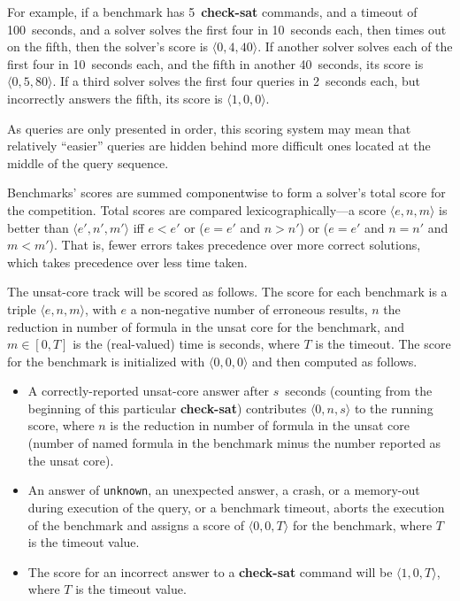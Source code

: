 \documentclass[12pt]{article}
\newcommand{\akey}[1]{\textbf{#1}}
\begin{document}
For example, if a benchmark has 5~\akey{check-sat} commands, and a
timeout of 100~seconds, and a solver solves the first four in
10~seconds each, then times out on the fifth, then the solver's score
is $\langle0,4,40\rangle$.  If another solver solves each of the first
four in 10~seconds each, and the fifth in another 40~seconds, its
score is $\langle0,5,80\rangle$.  If a third solver solves the first
four queries in 2~seconds each, but incorrectly answers the fifth, its
score is $\langle1,0,0\rangle$.

As queries are only presented in order, this scoring system may mean
that relatively ``easier'' queries are hidden behind more difficult
ones located at the middle of the query sequence.

Benchmarks' scores are summed componentwise to form a solver's total
score for the competition.
Total scores are compared lexicographically---a score $\langle e,n,m\rangle$ is better than 
$\langle e',n',m'\rangle$ iff $e < e'$ or ($e = e'$ and $n > n'$) or ($e = e'$ and $n = n'$ and $m < m'$).
That is, fewer errors takes precedence over more correct solutions, which takes precedence over less time taken.


The unsat-core track will be scored as follows. The score for each benchmark is a triple $\langle e,n,m\rangle$, with
$e$ a non-negative number of erroneous results,
$n$ the reduction in number of formula in the unsat core for the benchmark,
and $m\in[0,T]$ is the (real-valued) time is seconds, where $T$ is
the timeout. 
The score for the benchmark is initialized with
$\langle0,0,0\rangle$ and then computed as follows.
\begin{itemize}
\item A correctly-reported unsat-core answer after
  $s$~seconds (counting from the beginning of this particular
  \akey{check-sat}) contributes $\langle0,n,s\rangle$ to the running
  score, where $n$ is the reduction in number of formula in the unsat core (number of named formula in the benchmark minus
  the number reported as the unsat core).
\item An answer of \texttt{unknown}, an unexpected answer, a crash, or a memory-out during
  execution of the query, or a benchmark timeout, aborts the execution
  of the benchmark and assigns a score of $\langle0,0,T\rangle$ for the benchmark, where
  $T$ is the timeout value.
  
\item The score for an incorrect answer to a \akey{check-sat} command 
  will be $\langle1,0,T\rangle$, where
  $T$ is the timeout value.
\end{itemize}
\end{document}
